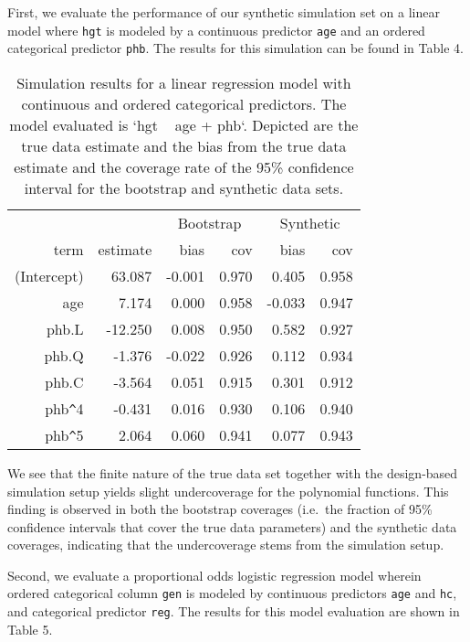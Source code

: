 \documentclass[psych,article,submit,moreauthors,pdftex]{mdpi}
\begin{document}
First, we evaluate the performance of our synthetic simulation set on a
linear model where \texttt{hgt} is modeled by a continuous predictor
\texttt{age} and an ordered categorical predictor \texttt{phb}. The
results for this simulation can be found in Table 4.

\begin{table}[ht]
\caption{Simulation results for a linear regression model with continuous and ordered categorical predictors. The model evaluated is `hgt ~ age + phb`. Depicted are the true data estimate and the bias from the true data estimate and the coverage rate of the 95\% confidence interval for the bootstrap and synthetic data sets.}
\centering
\begin{tabular}{rrrrrr}
  \hline
  & & \multicolumn{2}{c}{Bootstrap} & \multicolumn{2}{c}{Synthetic}\\
 term & estimate & bias & cov & bias & cov \\ 
  \hline
(Intercept) & 63.087 & -0.001 & 0.970 & 0.405 & 0.958 \\ 
  age & 7.174 & 0.000 & 0.958 & -0.033 & 0.947 \\ 
  phb.L & -12.250 & 0.008 & 0.950 & 0.582 & 0.927 \\ 
  phb.Q & -1.376 & -0.022 & 0.926 & 0.112 & 0.934 \\ 
  phb.C & -3.564 & 0.051 & 0.915 & 0.301 & 0.912 \\ 
  phb\verb|^|4 & -0.431 & 0.016 & 0.930 & 0.106 & 0.940 \\ 
  phb\verb|^|5 & 2.064 & 0.060 & 0.941 & 0.077 & 0.943 \\ 
   \hline
\end{tabular}
\end{table}

We see that the finite nature of the true data set together with the
design-based simulation setup yields slight undercoverage for the
polynomial functions. This finding is observed in both the bootstrap
coverages (i.e.~the fraction of 95\% confidence intervals that cover the
true data parameters) and the synthetic data coverages, indicating that
the undercoverage stems from the simulation setup.

Second, we evaluate a proportional odds logistic regression model
wherein ordered categorical column \texttt{gen} is modeled by continuous
predictors \texttt{age} and \texttt{hc}, and categorical predictor
\texttt{reg}. The results for this model evaluation are shown in Table
5.
\end{document}
